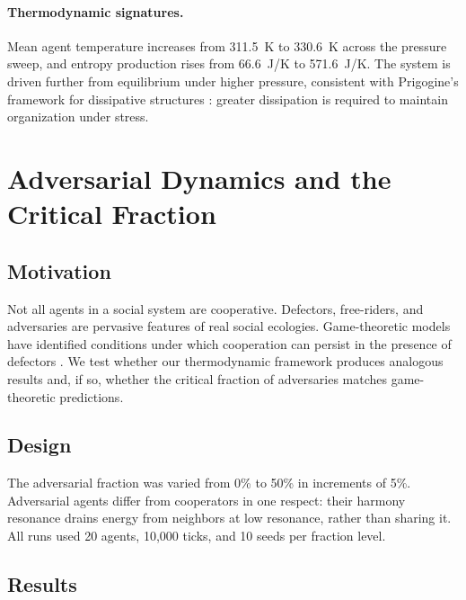 \documentclass[12pt,a4paper]{article}
\begin{document}
\paragraph{Thermodynamic signatures.} Mean agent temperature increases from 311.5~K to 330.6~K across the pressure sweep, and entropy production rises from 66.6~J/K to 571.6~J/K. The system is driven further from equilibrium under higher pressure, consistent with Prigogine's framework for dissipative structures \citep{prigogine1977}: greater dissipation is required to maintain organization under stress.

\section{Adversarial Dynamics and the Critical Fraction}
\label{sec:adversarial}

\subsection{Motivation}

Not all agents in a social system are cooperative. Defectors, free-riders, and adversaries are pervasive features of real social ecologies. Game-theoretic models have identified conditions under which cooperation can persist in the presence of defectors \citep{axelrod1984, nowak2006}. We test whether our thermodynamic framework produces analogous results and, if so, whether the critical fraction of adversaries matches game-theoretic predictions.

\subsection{Design}

The adversarial fraction was varied from 0\% to 50\% in increments of 5\%. Adversarial agents differ from cooperators in one respect: their harmony resonance drains energy from neighbors at low resonance, rather than sharing it. All runs used 20 agents, 10{,}000 ticks, and 10 seeds per fraction level.

\subsection{Results}
\end{document}
